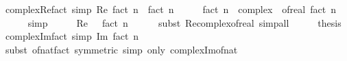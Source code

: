 \begin{isabellebody}
\isanewline
{}\isamarkupfalse%
\ complex{\isacharunderscore}{\kern0pt}Re{\isacharunderscore}{\kern0pt}fact\ {\isacharbrackleft}{\kern0pt}simp{\isacharbrackright}{\kern0pt}{\isacharcolon}{\kern0pt}\ {\isachardoublequoteopen}Re\ {\isacharparenleft}{\kern0pt}fact\ n{\isacharparenright}{\kern0pt}\ {\isacharequal}{\kern0pt}\ fact\ n{\isachardoublequoteclose}\isanewline
%
\isadelimproof
%
\endisadelimproof
%
\isatagproof
{}\isamarkupfalse%
\ {\isacharminus}{\kern0pt}\isanewline
\ \ \isamarkupfalse%
\ {\isachardoublequoteopen}{\isacharparenleft}{\kern0pt}fact\ n\ {\isacharcolon}{\kern0pt}{\isacharcolon}{\kern0pt}\ complex{\isacharparenright}{\kern0pt}\ {\isacharequal}{\kern0pt}\ of{\isacharunderscore}{\kern0pt}real\ {\isacharparenleft}{\kern0pt}fact\ n{\isacharparenright}{\kern0pt}{\isachardoublequoteclose}\isanewline
\ \ \ \ \isamarkupfalse%
\ simp\isanewline
\ \ \isamarkupfalse%
\ \isamarkupfalse%
\ {\isachardoublequoteopen}Re\ {\isasymdots}\ {\isacharequal}{\kern0pt}\ fact\ n{\isachardoublequoteclose}\isanewline
\ \ \ \ \isamarkupfalse%
\ {\isacharparenleft}{\kern0pt}subst\ Re{\isacharunderscore}{\kern0pt}complex{\isacharunderscore}{\kern0pt}of{\isacharunderscore}{\kern0pt}real{\isacharparenright}{\kern0pt}\ simp{\isacharunderscore}{\kern0pt}all\isanewline
\ \ \isamarkupfalse%
\ \isamarkupfalse%
\ {\isacharquery}{\kern0pt}thesis\ \isacommand{{\isachardot}{\kern0pt}}\isamarkupfalse%
\isanewline
{}\isamarkupfalse%
%
\endisatagproof
{\isafoldproof}%
%
\isadelimproof
\isanewline
%
\endisadelimproof
\isanewline
{}\isamarkupfalse%
\ complex{\isacharunderscore}{\kern0pt}Im{\isacharunderscore}{\kern0pt}fact\ {\isacharbrackleft}{\kern0pt}simp{\isacharbrackright}{\kern0pt}{\isacharcolon}{\kern0pt}\ {\isachardoublequoteopen}Im\ {\isacharparenleft}{\kern0pt}fact\ n{\isacharparenright}{\kern0pt}\ {\isacharequal}{\kern0pt}\ {}{\isachardoublequoteclose}\isanewline
%
\isadelimproof
\ \ %
\endisadelimproof
%
\isatagproof
{}\isamarkupfalse%
\ {\isacharparenleft}{\kern0pt}subst\ of{\isacharunderscore}{\kern0pt}nat{\isacharunderscore}{\kern0pt}fact\ {\isacharbrackleft}{\kern0pt}symmetric{\isacharbrackright}{\kern0pt}{\isacharparenright}{\kern0pt}\ {\isacharparenleft}{\kern0pt}simp\ only{\isacharcolon}{\kern0pt}\ complex{\isacharunderscore}{\kern0pt}Im{\isacharunderscore}{\kern0pt}of{\isacharunderscore}{\kern0pt}nat{\isacharparenright}{\kern0pt}%
\endisatagproof
{\isafoldproof}%

\end{isabellebody}

